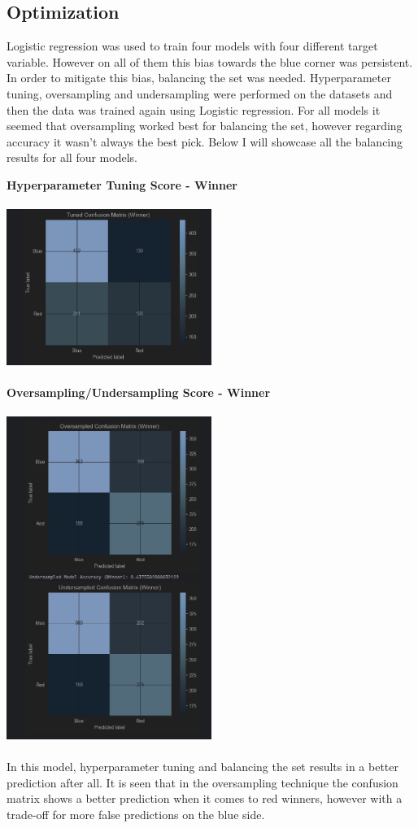 \documentclass{article}
\begin{document}
\subsection{Optimization}
Logistic regression was used to train four models with four different target variable. However on all of them this bias towards the blue corner was persistent. In order to mitigate this bias, balancing the set was needed. Hyperparameter tuning, oversampling and undersampling were performed on the datasets and then the data was trained again using Logistic regression. For all models it seemed that oversampling worked best for balancing the set, however regarding accuracy it wasn't always the best pick.
Below I will showcase all the balancing results for all four models.
\newpage


	{\large \textbf{Hyperparameter Tuning Score - Winner}}\\\\
	\includegraphics[width=0.5\textwidth]{images/CM_Hyp_Winner.png}\\\\

	{\large \textbf{Oversampling/Undersampling Score - Winner}}\\\\
	\includegraphics[width=0.5\textwidth]{images/CM_U_O_Win.png}\\\\
	In this model, hyperparameter tuning and balancing the set results in a better prediction after all. It is seen that in the oversampling technique the confusion matrix shows a better prediction when it comes to red winners, however with a trade-off for more false predictions on the blue side.
	
\end{document}

